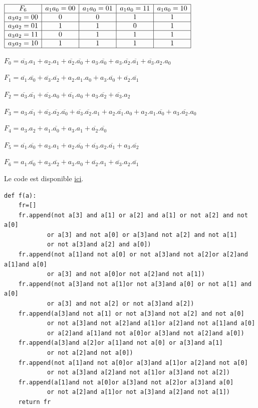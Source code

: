 \begin{center}
$\begin{array}{|c|c|c|c|c|}
\hline
F_6 & a_1a_0=00 & a_1a_0=01 & a_1a_0=11 & a_1a_0=10 \\
\hline
a_3a_2=00  & 0   &  0  &  1  &  1  \\
\hline
a_3a_2=01  &  1  &  1  &  0  & 1   \\
\hline
a_3a_2=11  &  0  &  1  &  1  & 1   \\
\hline
a_3a_2=10  &  1  &  1  &  1  & 1   \\
\hline
\end{array}$
\end{center}


$F_0=\overline{a_3}.a_1+a_2.a_1+\overline{a_2}.\overline{a_0}+a_3.\overline{a_0}+a_3.\overline{a_2}.\overline{a_1}+\overline{a_3}.a_2.a_0$

$F_1=\overline{a_1}.\overline{a_0}+\overline{a_3}.\overline{a_2}+a_2.a_1.a_0+a_3.\overline{a_0}+\overline{a_2}.\overline{a_1}$

$F_2=\overline{a_3}.\overline{a_1}+\overline{a_3}.a_0+\overline{a_1}.a_0+a_3.\overline{a_2}+\overline{a_3}.a_2$

$F_3=a_3.\overline{a_1}+\overline{a_3}.\overline{a_2}.\overline{a_0}+\overline{a_3}.\overline{a_2}.a_1+a_2.\overline{a_1}.a_0+a_2.a_1.\overline{a_0}+a_3.\overline{a_2}.a_0$

$F_4=a_3.a_2+a_1.\overline{a_0}+a_3.a_1+\overline{a_2}.\overline{a_0}$

$F_5=\overline{a_1}.\overline{a_0}+a_3.a_1+a_2.\overline{a_0}+\overline{a_3}.a_2.\overline{a_1}+a_3.\overline{a_2}$

$F_6=a_1.\overline{a_0}+a_3.\overline{a_2}+a_3.a_0+\overline{a_2}.a_1+\overline{a_3}.a_2.\overline{a_1}$


Le code est disponible \href{https://github.com/Costadoat/S10/raw/master/TP01\%20Fonctions\%20combinatoires/Code/Calculatrice.py}{ici}.

\begin{verbatim}
def f(a):
    fr=[]
    fr.append(not a[3] and a[1] or a[2] and a[1] or not a[2] and not a[0]
    		or a[3] and not a[0] or a[3]and not a[2] and not a[1]
    		or not a[3]and a[2] and a[0])
    fr.append(not a[1]and not a[0] or not a[3]and not a[2]or a[2]and a[1]and a[0]
    		or a[3] and not a[0]or not a[2]and not a[1])
    fr.append(not a[3]and not a[1]or not a[3]and a[0] or not a[1] and a[0]
    		or a[3] and not a[2] or not a[3]and a[2])
    fr.append(a[3]and not a[1] or not a[3]and not a[2] and not a[0]
    		or not a[3]and not a[2]and a[1]or a[2]and not a[1]and a[0]
    		or a[2]and a[1]and not a[0]or a[3]and not a[2]and a[0])
    fr.append(a[3]and a[2]or a[1]and not a[0] or a[3]and a[1]
    		or not a[2]and not a[0])
    fr.append(not a[1]and not a[0]or a[3]and a[1]or a[2]and not a[0]
    		or not a[3]and a[2]and not a[1]or a[3]and not a[2])
    fr.append(a[1]and not a[0]or a[3]and not a[2]or a[3]and a[0]
    		or not a[2]and a[1]or not a[3]and a[2]and not a[1])
    return fr
\end{verbatim}
    

